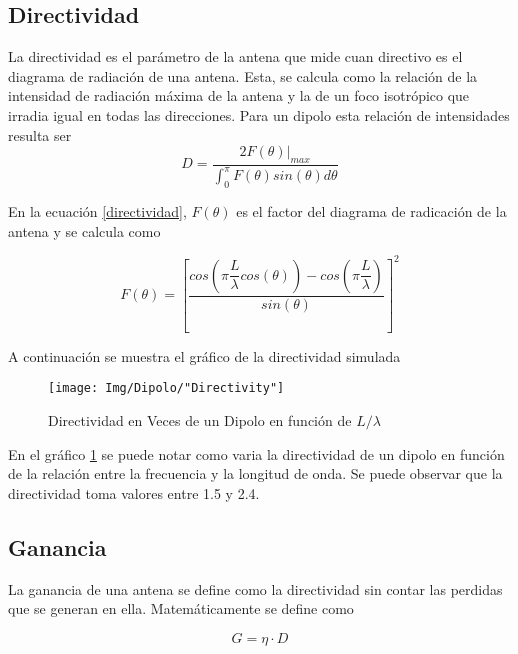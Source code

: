 \documentclass{article}
\begin{document}
\subsection{Directividad}

La directividad es el parámetro de la antena que mide cuan directivo es el diagrama de radiación de una antena. Esta, se calcula como la relación de la intensidad de radiación máxima de la antena y la de un foco isotrópico que irradia igual en todas las direcciones.  Para un dipolo esta relación de intensidades resulta ser
\begin{equation}
    D = \dfrac{2 F(\theta)|_{max}}{\int_{0}^{\pi} F(\theta)sin(\theta)d\theta}
    \label{directividad}
\end{equation}

En la ecuación \ref{directividad}, $F(\theta)$ es el factor del diagrama de radicación de la antena y se calcula como 

\begin{equation}
    F(\theta) = 
        \left[
            \dfrac{cos
                \left(
                    \pi\dfrac{L}{\lambda} cos(\theta)\right)
                    - cos\left( \pi \dfrac{L}{\lambda}\right)}
                    {sin(\theta)}
        \right]^{2}
\end{equation}

A continuación se muestra el gráfico de la directividad simulada 

\begin{figure}[H]

        \centering
        \texttt{[image: Img/Dipolo/"Directivity"]}
        \caption{Directividad en Veces de un Dipolo en función de $L/\lambda$}
        \label{directividad_dipolo_plot}
\end{figure}

En el gráfico \ref{directividad_dipolo_plot} se puede notar como varia la directividad de un dipolo en función de la relación entre la frecuencia y la longitud de onda. Se puede observar que la directividad toma valores entre 1.5 y 2.4.

\subsection{Ganancia}

La ganancia de una antena se define como la directividad sin contar las perdidas que se generan en ella. Matemáticamente se define como

\begin{equation}
    G = \eta \cdot D
\end{equation}
\end{document}
